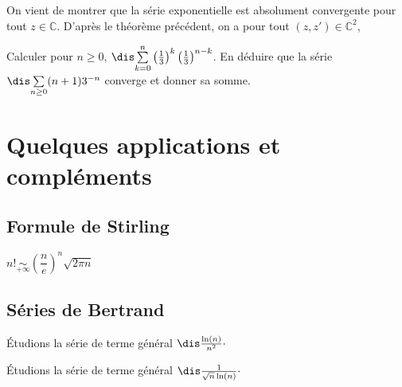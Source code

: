 \documentclass[a4paper,10pt]{report}
\newcommand{\Sum}[2]{\ensuremath{\textstyle{\sum\limits_{#1}^{#2}}}}
\begin{document}
\noindent On vient de montrer que la série exponentielle est absolument convergente pour tout $z \in \mathbb{C}$. D'après le théorème précédent, on a pour tout $(z,z') \in \mathbb{C}^2$,


\vspace{7cm}

\begin{exa}
Calculer pour $n \geq 0$, $\dis \Sum{k=0}{n}  \left( \frac{1}{3} \right)^k \left( \frac{1}{3} \right)^{n-k}$. En déduire que la série $\dis \Sum{n \geq 0}{}  (n+1)3^{-n}$ converge et donner sa somme.
\end{exa}

\section{Quelques applications et compléments}
\subsection{Formule de Stirling}

\begin{thm}
\begin{center}
$n! \underset{ + \infty}{\sim} \left( \dfrac{n}{e}\right)^n \sqrt{2 \pi n}$
\end{center}
\end{thm}
\subsection{Séries de Bertrand}
\begin{ex} Étudions la série de terme général $\dis \frac{\ln(n)}{n^2}\cdot$

\vspace{3cm}
\end{ex}

\begin{ex} Étudions la série de terme général $\dis \frac{1}{\sqrt{n} \ln(n)}\cdot$

\vspace{3cm}
\end{ex}
\end{document}
